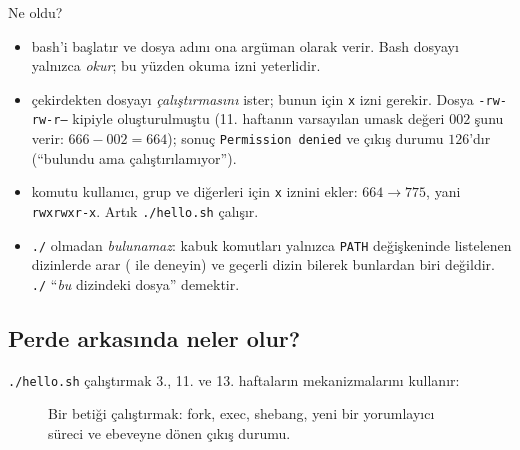 Ne oldu?
\begin{itemize}
  \item {} bash'i başlatır ve dosya adını ona argüman olarak verir. Bash dosyayı yalnızca \emph{okur}; bu yüzden okuma izni yeterlidir.
  \item {} çekirdekten dosyayı \emph{çalıştırmasını} ister; bunun için \texttt{x} izni gerekir. Dosya \texttt{-rw-rw-r--} kipiyle oluşturulmuştu (11. haftanın varsayılan umask değeri $002$ şunu verir: $666 - 002 = 664$); sonuç \texttt{Permission denied} ve çıkış durumu $126$'dır (“bulundu ama çalıştırılamıyor”).
  \item {} komutu kullanıcı, grup ve diğerleri için \texttt{x} iznini ekler: $664 \to 775$, yani \texttt{rwxrwxr-x}. Artık \texttt{./hello.sh} çalışır.
  \item \texttt{./} olmadan  \emph{bulunamaz}: kabuk komutları yalnızca \texttt{PATH} değişkeninde listelenen dizinlerde arar ( ile deneyin) ve geçerli dizin bilerek bunlardan biri değildir. \texttt{./} “\emph{bu} dizindeki dosya” demektir.
\end{itemize}

\subsection{Perde arkasında neler olur?}

\texttt{./hello.sh} çalıştırmak 3., 11. ve 13. haftaların mekanizmalarını kullanır:

\begin{figure}[H]
\centering
{}
\caption{Bir betiği çalıştırmak: fork, exec, shebang, yeni bir yorumlayıcı süreci ve ebeveyne dönen çıkış durumu.}
\end{figure}

